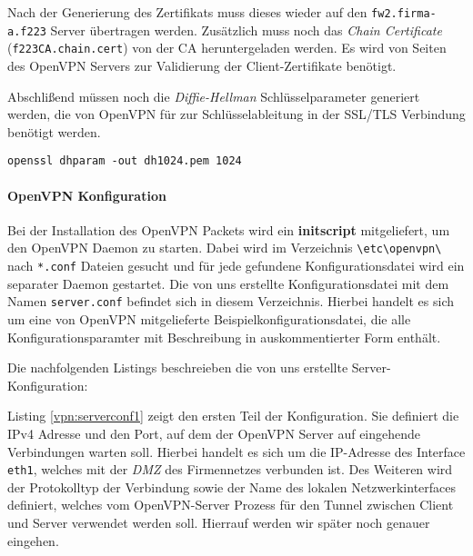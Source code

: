 Nach der Generierung des Zertifikats muss dieses wieder auf den \texttt{fw2.firma-a.f223} Server übertragen werden. Zusätzlich muss noch das \emph{Chain Certificate} (\texttt{f223CA.chain.cert}) von der CA heruntergeladen werden. Es wird von Seiten des OpenVPN Servers zur Validierung der Client-Zertifikate benötigt.

Abschlißend müssen noch die \emph{Diffie-Hellman} Schlüsselparameter generiert werden, die von OpenVPN für zur Schlüsselableitung in der SSL/TLS Verbindung benötigt werden.

\begin{lstlisting}
openssl dhparam -out dh1024.pem 1024
\end{lstlisting}

\paragraph{OpenVPN Konfiguration}

Bei der Installation des OpenVPN Packets wird ein \textbf{initscript} mitgeliefert, um den OpenVPN Daemon zu starten. Dabei wird im Verzeichnis \texttt{\textbackslash etc\textbackslash openvpn\textbackslash} nach \texttt{*.conf} Dateien gesucht und für jede gefundene Konfigurationsdatei wird ein separater Daemon gestartet. Die von uns erstellte Konfigurationsdatei mit dem Namen \texttt{server.conf} befindet sich in diesem Verzeichnis. Hierbei handelt es sich um eine von OpenVPN mitgelieferte Beispielkonfigurationsdatei, die alle Konfigurationsparamter mit Beschreibung in auskommentierter Form enthält.

Die nachfolgenden Listings beschreieben die von uns erstellte Server-Konfiguration:



Listing \ref{vpn:serverconf1} zeigt den ersten Teil der Konfiguration. Sie definiert die IPv4 Adresse und den Port, auf dem der OpenVPN Server auf eingehende Verbindungen warten soll. Hierbei handelt es sich um die IP-Adresse des Interface \texttt{eth1}, welches mit der \emph{DMZ} des Firmennetzes verbunden ist. Des Weiteren wird der Protokolltyp der Verbindung sowie der Name des lokalen Netzwerkinterfaces definiert, welches vom OpenVPN-Server Prozess für den Tunnel zwischen Client und Server verwendet werden soll. Hierrauf werden wir später noch genauer eingehen.

